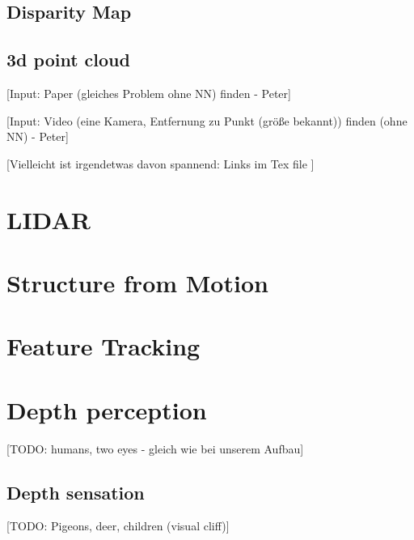 \subsection{Disparity Map}

\subsection{3d point cloud}


[Input: Paper (gleiches Problem ohne NN) finden - Peter]

[Input: Video (eine Kamera, Entfernung zu Punkt (größe bekannt)) finden (ohne NN) - Peter]


[Vielleicht ist irgendetwas davon spannend:
Links im Tex file
]

\section{LIDAR}

\section{Structure from Motion}

\section{Feature Tracking}

\section{Depth perception}
[TODO: humans, two eyes - gleich wie bei unserem Aufbau]

\subsection{Depth sensation}
[TODO: Pigeons, deer, children (visual cliff)]


\filbreak